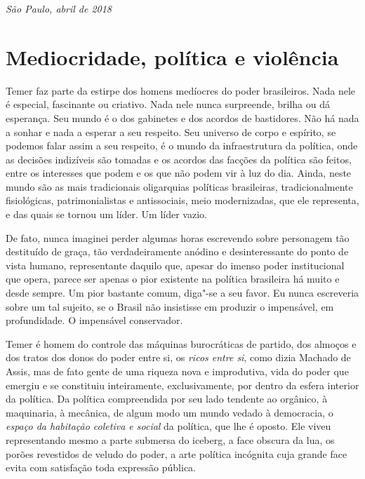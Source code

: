 \medskip

\begin{flushright}
\emph{São Paulo, abril de 2018}
\end{flushright}

\chapter{Mediocridade, política e violência}

Temer faz parte da estirpe dos homens medíocres do poder brasileiros.
Nada nele é especial, fascinante ou criativo. Nada nele nunca
surpreende, brilha ou dá esperança. Seu mundo é o dos gabinetes e dos
acordos de bastidores. Não há nada a sonhar e nada a esperar a seu
respeito. Seu universo de corpo e espírito, se podemos falar assim a seu
respeito, é o mundo da infraestrutura da política, onde as decisões
indizíveis são tomadas e os acordos das facções da política são feitos,
entre os interesses que podem e os que não podem vir à luz do dia.
Ainda, neste mundo são as mais tradicionais oligarquias políticas
brasileiras, tradicionalmente fisiológicas, patrimonialistas e
antissociais, meio modernizadas, que ele representa, e das quais se
tornou um líder. Um líder vazio.

De fato, nunca imaginei perder algumas horas escrevendo sobre personagem
tão destituído de graça, tão verdadeiramente anódino e desinteressante
do ponto de vista humano, representante daquilo que, apesar do imenso
poder institucional que opera, parece ser apenas o pior
existente na política brasileira há muito e desde sempre. Um pior
bastante comum, diga"-se a seu favor. Eu nunca escreveria sobre um tal
sujeito, se o Brasil não insistisse em produzir o impensável, em profundidade. O
impensável conservador.

Temer é homem do controle das máquinas burocráticas de partido, dos
almoços e dos tratos dos donos do poder entre si, os \emph{ricos entre
si}, como dizia Machado de Assis, mas de fato gente de uma riqueza nova
e improdutiva, vida do poder que emergiu e se constituiu
inteiramente, exclusivamente, por dentro da esfera interior da política.
Da política compreendida por seu lado tendente ao orgânico, à
maquinaria, à mecânica, de algum modo um mundo vedado à democracia, o
\emph{espaço da habitação coletiva e social} da política, que lhe é
oposto. Ele viveu representando mesmo a parte submersa do iceberg, a
face obscura da lua, os porões revestidos de veludo do poder, a arte
política incógnita cuja grande face evita com satisfação toda expressão
pública.

